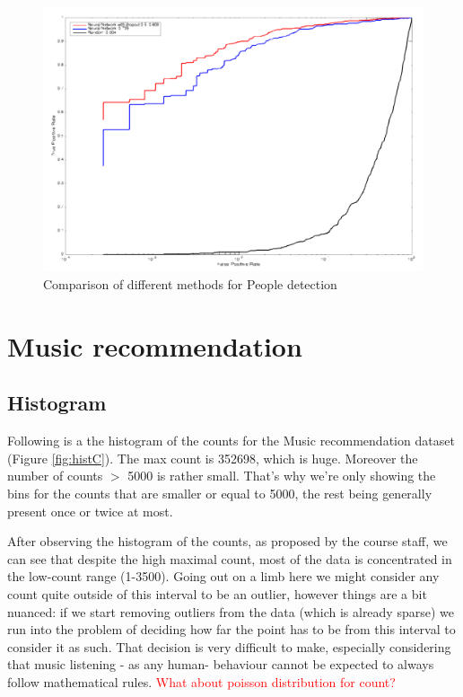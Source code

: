 \documentclass{article} %
\begin{document}
\begin{figure}
\centering
\includegraphics[width=1\textwidth]{images/TPRplot.png}
\caption{Comparison of different methods for People detection}
\label{fig:pdplot}
\end{figure}
\section{Music recommendation}
\subsection{Histogram}
Following is a the histogram of the counts for the Music recommendation dataset (Figure \ref{fig:histC}). The max count is 352698, which is huge. Moreover the number of counts $>$ 5000 is rather small. That’s why we’re only showing the bins for the counts that are smaller or equal to 5000, the rest being generally present once or twice at most.

After observing the histogram of the counts, as proposed by the course staff, we can see that despite the high maximal count, most of the data is concentrated in the low-count range (1-3500). Going out on a limb here we might consider any count quite outside of this interval to be an outlier, however things are a bit nuanced: if we start removing outliers from the data (which is already sparse) we run into the problem of deciding how far the point has to be from this interval to consider it as such. That decision is very difficult to make, especially considering that music listening - as any human-  behaviour cannot be expected to always follow mathematical rules. \textcolor{red}{What about poisson distribution for count?}
\end{document}
